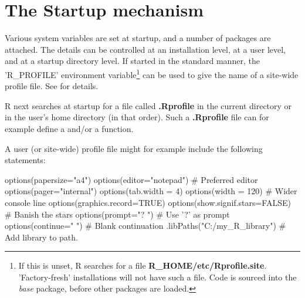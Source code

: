 \section{The Startup mechanism}

Various system variables are set at startup, and a number of packages
are attached.  The details can be controlled at an installation level,
at a user level, and at a startup directory level.  If started in the
standard manner, the 'R\_PROFILE' environment variable\footnote{If
  this is unset, R searches for a file {\bf
    R\_HOME/etc/Rprofile.site}.  'Factory-fresh' installations will
  not have such a file.  Code is sourced into the \textit{base}
  package, before other packages are loaded.} can be used to give the
name of a site-wide profile file.  See  for
details.

R next searches at startup for a file called \textbf{.Rprofile} in the
current directory or in the user's home directory (in that
order).
Such a \textbf{.Rprofile} file can for example define a
 and/or a  function.

A user (or site-wide) profile file might for example include the
following statements:
\begin{Schunk}
\begin{Sinput}
options(papersize="a4")
options(editor="notepad")         # Preferred editor
options(pager="internal")
options(tab.width = 4)
options(width = 120)              # Wider console line
options(graphics.record=TRUE)
options(show.signif.stars=FALSE)  # Banish the stars
options(prompt="? ")              # Use '?' as prompt
options(continue="  ")            # Blank continuation
.libPaths("C:/my_R_library")      # Add library to path.
\end{Sinput}
\end{Schunk}
